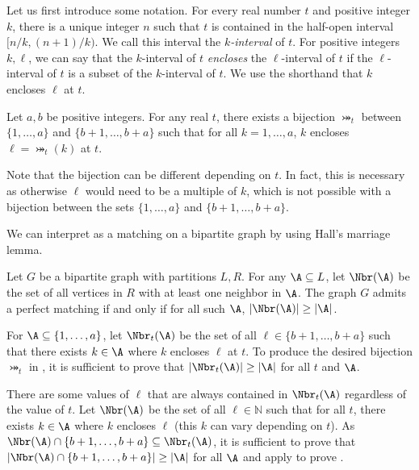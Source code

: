 Let us first introduce some notation. For every real number $t$ and positive integer $k$, there is a unique integer $n$ such that $t$ is contained in the half-open interval $[n/k, (n+1)/k)$. We call this interval the \emph{$k$-interval} of $t$. For positive integers $k,\ell$, we can say that the $k$-interval of $t$ \emph{encloses} the $\ell$-interval of $t$ if the $\ell$-interval of $t$ is a subset of the $k$-interval of $t$. We use the shorthand that $k$ encloses $\ell$ at $t$.

\begin{lemma}
    \label{lemma:intervalmatching}
    Let $a,b$ be positive integers. For any real $t$, there exists a bijection $\bij_t$ between $\{1,\dots,a\}$ and $\{b+1,\dots,b+a\}$ such that for all $k=1,\dots,a$, $k$ encloses $\ell=\bij_t(k)$ at $t$.
\end{lemma}
Note that the bijection can be different depending on $t$. In fact, this is necessary as otherwise $\ell$ would need to be a multiple of $k$, which is not possible with a bijection between the sets $\{1,\dots,a\}$ and $\{b+1,\dots,b+a\}$.

We can interpret  as a matching on a bipartite graph by using Hall's marriage lemma.

\begin{lemma}
    \label{thm:hall}
    Let $G$ be a bipartite graph with partitions $L,R$. For any $\A\subseteq L$, let $\Nbr(\A)$ be the set of all vertices in $R$ with at least one neighbor in $\A$. The graph $G$ admits a perfect matching if and only if for all such $\A$, $|\Nbr(\A)|\ge |\A|$. 
\end{lemma}

For $\A\subseteq \{1,\dots,a\}$, let $\Nbr_t(\A)$ be the set of all $\ell\in\{b+1,\dots,b+a\}$ such that there exists $k\in \A$ where $k$ encloses $\ell$ at $t$. To produce the desired bijection $\bij_t$ in , it is sufficient to prove that $|\Nbr_t(\A)|\ge |\A|$ for all $t$ and $\A$.

There are some values of $\ell$ that are always contained in $\Nbr_t(\A)$ regardless of the value of $t$. Let $\Nbr(\A)$ be the set of all $\ell\in\mathbb{N}$ such that for all $t$, there exists $k\in \A$ where $k$ encloses $\ell$ (this $k$ can vary depending on $t$). As $\Nbr(\A)\cap \{b+1,\dots,b+a\}\subseteq \Nbr_t(\A)$, it is sufficient to prove that $|\Nbr(\A)\cap \{b+1,\dots,b+a\}|\ge |\A|$ for all $\A$ and apply  to prove .

